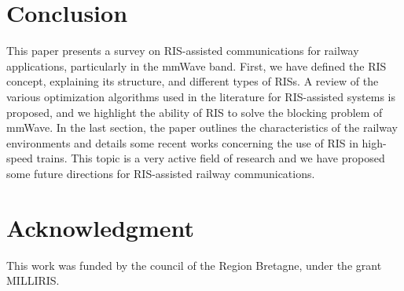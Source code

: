 \documentclass[conference]{IEEEtran}
\begin{document}
\section{Conclusion}
\label{sec:conclusion}
This paper presents a survey on RIS-assisted communications for railway applications, particularly in the mmWave band. First, we have defined the RIS concept, explaining its structure, and different types of RISs. A review of the various optimization algorithms used in the literature for RIS-assisted systems is proposed, and we highlight the ability of RIS to solve the blocking problem of mmWave. In the last section, the paper outlines
the characteristics of the railway environments and details some recent works concerning the use of RIS in high-speed trains. This topic is a very active field of research and we have proposed some future directions  for RIS-assisted railway communications.

\section*{Acknowledgment}
This work was funded by the council of the Region Bretagne, under the grant MILLIRIS.



\vspace{12pt}
\end{document}
